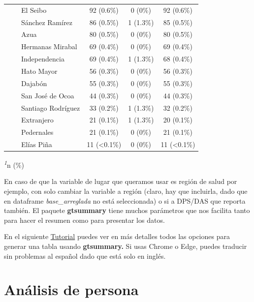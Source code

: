 \documentclass[
  letterpaper,
  DIV=11,
  numbers=noendperiod]{scrreprt}
\begin{document}
\begin{table}
\begin{tabular*}{\linewidth}{@{\extracolsep{\fill}}lccc}
    El Seibo & 92 (0.6\%) & 0 (0\%) & 92 (0.6\%) \\ 
    Sánchez Ramírez & 86 (0.5\%) & 1 (1.3\%) & 85 (0.5\%) \\ 
    Azua & 80 (0.5\%) & 0 (0\%) & 80 (0.5\%) \\ 
    Hermanas Mirabal & 69 (0.4\%) & 0 (0\%) & 69 (0.4\%) \\ 
    Independencia & 69 (0.4\%) & 1 (1.3\%) & 68 (0.4\%) \\ 
    Hato Mayor & 56 (0.3\%) & 0 (0\%) & 56 (0.3\%) \\ 
    Dajabón & 55 (0.3\%) & 0 (0\%) & 55 (0.3\%) \\ 
    San José de Ocoa & 44 (0.3\%) & 0 (0\%) & 44 (0.3\%) \\ 
    Santiago Rodríguez & 33 (0.2\%) & 1 (1.3\%) & 32 (0.2\%) \\ 
    Extranjero & 21 (0.1\%) & 1 (1.3\%) & 20 (0.1\%) \\ 
    Pedernales & 21 (0.1\%) & 0 (0\%) & 21 (0.1\%) \\ 
    Elías Piña & 11 (<0.1\%) & 0 (0\%) & 11 (<0.1\%) \\ 
\bottomrule
\end{tabular*}
\begin{minipage}{\linewidth}
\textsuperscript{\textit{1}}n (\%)\\
\end{minipage}
\end{table}

En caso de que la variable de lugar que queramos usar es región de salud
por ejemplo, con solo cambiar la variable a región (claro, hay que
incluirla, dado que en dataframe \emph{base\_arreglada} no está
seleccionada) o si a DPS/DAS que reporta también. El paquete
\textbf{gtsummary} tiene muchos parámetros que nos facilita tanto para
hacer el resumen como para presentar los datos.

En el siguiente
\href{https://www.danieldsjoberg.com/gtsummary/articles/tbl_summary.html}{Tutorial}
puedes ver en más detalles todos las opciones para generar una tabla
usando \textbf{gtsummary.} Si usas Chrome o Edge, puedes traducir sin
problemas al español dado que está solo en inglés.

\section{Análisis de persona}\label{anuxe1lisis-de-persona}
\end{document}

